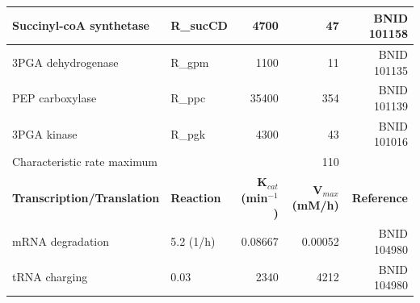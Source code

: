 \documentclass[12pt]{article}
\begin{document}
\begin{table}
\begin{tabular}{llrrr}
\phantom{i}Succinyl-coA synthetase & R\_sucCD & 4700 & 47 & BNID 101158 \\ \hline
\phantom{i}3PGA dehydrogenase & R\_gpm & 1100 & 11 & BNID 101135 \\ \hline
\phantom{i}PEP carboxylase & R\_ppc & 35400 & 354 & BNID 101139 \\ \hline
\phantom{i}3PGA kinase & R\_pgk & 4300 & 43 & BNID 101016 \\ \midrule
\phantom{i}Characteristic rate maximum & & & 110 & \\ \toprule
\phantom{i}\textbf{Transcription/Translation} & \textbf{Reaction} & \textbf{K$_{cat}$ (min$^{-1}$)} & \textbf{V$_{max}$ (mM/h)} & \textbf{Reference} \\ \hline
\phantom{i}mRNA degradation & 5.2 (1/h) & 0.08667 & 0.00052 & BNID 104980 \\ \hline
\phantom{i}tRNA charging & 0.03 & 2340 & 4212 & BNID 104980 \\ \hline
 \end{tabular}
\label{tbl:Rate_maxima}
\end{table}
\end{document}
